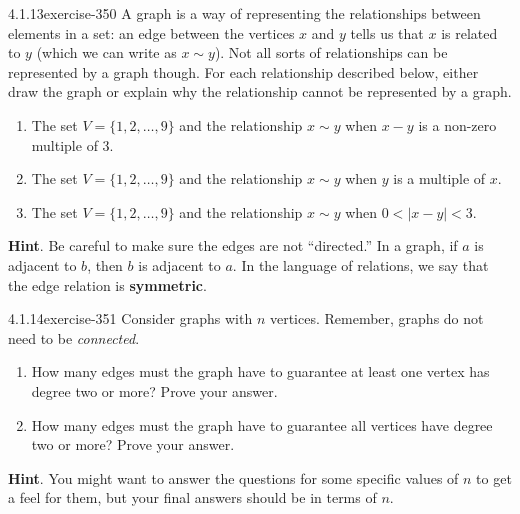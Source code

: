\documentclass[twoside,11pt,]{book}
\newcommand{\terminology}[1]{\textbf{#1}}
\numberwithin{equation}{chapter}
\newcommand{\lt}{<}
\begin{document}
\begin{divisionsolution}{4.1.13}{}{exercise-350}%
\hypertarget{p-4476}{}%
A graph is a way of representing the relationships between elements in a set: an edge between the vertices \(x\) and \(y\) tells us that \(x\) is related to \(y\) (which we can write as \(x \sim y\)).  Not all sorts of relationships can be represented by a graph though.  For each relationship described below, either draw the graph or explain why the relationship cannot be represented by a graph.\leavevmode%
\begin{enumerate}[label=(\alph*)]
\item\hypertarget{li-2248}{}\hypertarget{p-4477}{}%
The set \(V = \{1,2, \ldots, 9\}\) and the relationship \(x \sim y\) when \(x-y\) is a non-zero multiple of 3.%
\item\hypertarget{li-2249}{}\hypertarget{p-4478}{}%
The set \(V = \{1,2, \ldots, 9\}\) and the relationship \(x \sim y\) when \(y\) is a multiple of \(x\).%
\item\hypertarget{li-2250}{}\hypertarget{p-4479}{}%
The set \(V = \{1,2,\ldots, 9\}\) and the relationship \(x \sim y\) when \(0 \lt |x-y| \lt 3\).%
\end{enumerate}
%
\par\smallskip%
\noindent\textbf{Hint}.\quad%
\hypertarget{p-4480}{}%
Be careful to make sure the edges are not ``directed.''  In a graph, if \(a\) is adjacent to \(b\), then \(b\) is adjacent to \(a\).  In the language of relations, we say that the edge relation is \terminology{symmetric}.%
\end{divisionsolution}%
\begin{divisionsolution}{4.1.14}{}{exercise-351}%
\hypertarget{p-4481}{}%
Consider graphs with \(n\) vertices.  Remember, graphs do not need to be \emph{connected}.\leavevmode%
\begin{enumerate}[label=(\alph*)]
\item\hypertarget{li-2251}{}\hypertarget{p-4482}{}%
How many edges must the graph have to guarantee at least one vertex has degree two or more?  Prove your answer.%
\item\hypertarget{li-2252}{}\hypertarget{p-4483}{}%
How many edges must the graph have to guarantee all vertices have degree two or more?  Prove your answer.%
\end{enumerate}
%
\par\smallskip%
\noindent\textbf{Hint}.\quad%
\hypertarget{p-4484}{}%
You might want to answer the questions for some specific values of \(n\) to get a feel for them, but your final answers should be in terms of \(n\).%
\end{divisionsolution}%
\end{document}
